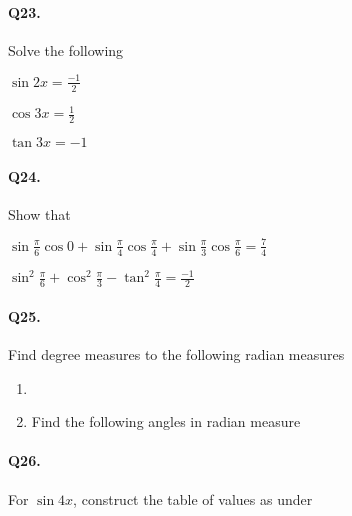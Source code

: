 \documentclass{article}
\begin{document}
\paragraph{Q23.}
Solve the following

\begin{enumerate*}[label=\alph*)]
  \item $\sin 2x = \frac{-1}{2}$
  \item $\cos 3x = \frac{1}{2}$
  \item $\tan 3x = -1$
\end{enumerate*}

\paragraph{Q24.}
Show that

\begin{enumerate*}[label=\alph*)]
  \item $\sin \frac{\pi}{6} \cos 0 + \sin \frac{\pi}{4} \cos \frac{\pi}{4} + \sin \frac{\pi}{3} \cos \frac{\pi}{6} = \frac{7}{4}$
  \item $\sin^{2} \frac{\pi}{6} + \cos^{2} \frac{\pi}{3} - \tan^{2} \frac{\pi}{4} = \frac{-1}{2}$
\end{enumerate*}

\paragraph{Q25.}
Find degree measures to the following radian measures
\begin{enumerate}[label=\alph*)]
  \item
  \item Find the following angles in radian measure
\end{enumerate}

\paragraph{Q26.}
For $\sin 4x$, construct the table of values as under
\end{document}
